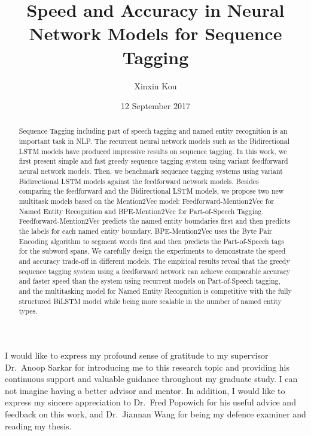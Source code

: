 \documentclass{sfuthesis}
\title{Speed and Accuracy in Neural Network Models for Sequence Tagging}
\author{Xinxin Kou}
\date{12 September 2017}
\begin{document}
\frontmatter
\maketitle{}

\begin{abstract}
Sequence Tagging including part of speech tagging and named entity recognition is an important task in NLP. The recurrent neural network models such as the Bidirectional LSTM models have produced impressive results on sequence tagging. In this work, we first present simple and fast greedy sequence tagging system using variant feedforward neural network models. Then, we benchmark sequence tagging systems using variant Bidirectional LSTM models against the feedforward network models. Besides comparing the feedforward and the Bidirectional LSTM models, we propose two new multitask models based on the Mention2Vec model: Feedforward-Mention2Vec for Named Entity Recognition and BPE-Mention2Vec for Part-of-Speech Tagging. Feedforward-Mention2Vec predicts the named entity boundaries first and then predicts the labels for each named entity boundary. BPE-Mention2Vec uses the Byte Pair Encoding algorithm to segment words first and then predicts the Part-of-Speech tags for the subword spans. We carefully design the experiments to demonstrate the speed and accuracy trade-off in different models. The empirical results reveal that the greedy sequence tagging system using a feedforward network can achieve comparable accuracy and faster speed than the system using recurrent models on Part-of-Speech tagging, and the multitasking model for Named Entity Recognition is competitive with the fully structured BiLSTM model while being more scalable in the number of named entity types.

\end{abstract}


\begin{acknowledgements} %

I would like to express my profound sense of gratitude to my supervisor Dr.\ Anoop Sarkar for introducing me to this research
topic and providing his continuous support and valuable guidance throughout my graduate study. I can not imagine having a better advisor and mentor. In addition, I would like to express my sincere appreciation to Dr.\ Fred Popowich for his useful advice and feedback on this work, and Dr.\ Jiannan Wang for being my defence examiner and reading my thesis.




\end{acknowledgements}
\end{document}
